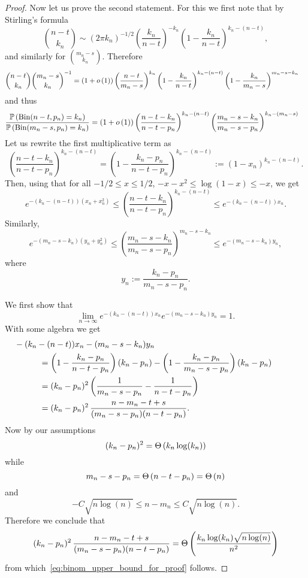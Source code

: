 \begin{appendices}
\begin{proof}
Now let us prove the second statement. For this we first note that by Stirling's formula
\[
	\binom{n-t}{k_n} \sim (2\pi k_n)^{-1/2} \left(\frac{k_n}{n-t}\right)^{-k_n}\left(1 - \frac{k_n}{n-t}\right)^{k_n - (n-t)},
\]
and similarly for $\binom{m_n-s}{k_n}$. Therefore
\begin{align*}
	\binom{n-t}{k_n} \binom{m_n - s}{k_n}^{-1}
	&= (1+o\left(1\right)) \left(\frac{n - t}{m_n-s}\right)^{k_n}\left(1 - \frac{k_n}{n-t}\right)^{k_n - (n-t)}
		\left(1 - \frac{k_n}{m_n-s}\right)^{m_n - s - k_n}
\end{align*}
and thus
\begin{align*}
	\frac{\mathbb{P}\left(\mathrm{Bin}(n-t,p_n) = k_n\right)}{\mathbb{P}\left(\mathrm{Bin}(m_n-s,p_n) = k_n\right)}
	&= (1+o\left(1\right)) \left(\frac{n - t - k_n}{n - t - p_n}\right)^{k_n - (n-t)} 
		\left(\frac{m_n - s - k_n}{m_n-s - p_n}\right)^{k_n - (m_n - s)}
\end{align*}
Let us rewrite the first multiplicative term as 
\[
	\left(\frac{n - t - k_n}{n - t - p_n}\right)^{k_n - (n-t)} 
	= \left(1 - \frac{k_n - p_n}{n - t -p_n}\right)^{k_n - (n-t)} := (1-x_n)^{k_n - (n-t)}.
\]
Then, using that for all $-1/2 \le x \le 1/2$, $-x - x^2 \le \log(1-x) \le -x$, we get
\[
	e^{-(k_n - (n-t))\left(x_n + x_n^2\right)}
	\le \left(\frac{n - t - k_n}{n - t - p_n}\right)^{k_n - (n-t)}
	\le e^{-(k_n - (n-t))x_n}.
\]
Similarly,
\[
	e^{-(m_n - s- k_n)\left(y_n + y_n^2\right)}
	\le \left(\frac{m_n - s - k_n}{m_n-s - p_n}\right)^{m_n - s - k_n}
	\le e^{-(m_n - s - k_n)y_n},
\]
where
\[
	y_n := \frac{k_n - p_n}{m_n - s -p_n}.
\]

We first show that 
\begin{equation}\label{eq:binom_upper_bound_for_proof}
	\lim_{n \to \infty} e^{-(k_n - (n-t))x_n}e^{-(m_n - s - k_n)y_n} = 1.
\end{equation}
With some algebra we get
\begin{align*}
	&\hspace{-30pt}-(k_n - (n-t))x_n - (m_n - s - k_n)y_n\\
	&= \left(1 - \frac{k_n -p_n}{n - t -p_n}\right)(k_n - p_n) 
		- \left(1 - \frac{k_n - p_n}{m_n - s - p_n}\right)(k_n - p_n)\\
	&= (k_n - p_n)^2 \left(\frac{1}{m_n - s - p_n} - \frac{1}{n - t - p_n}\right)\\
	&= (k_n - p_n)^2 \, \frac{n - m_n - t + s}{(m_n - s - p_n)(n - t - p_n)}.
\end{align*}
Now by our assumptions
\[
	(k_n - p_n)^2 = \Theta\left(k_n \log(k_n)\right)
\]
while
\[
	m_n - s - p_n = \Theta\left(n - t - p_n\right) = \Theta\left(n\right)
\]
and
\[
	-C \sqrt{n\log(n)} \le n - m_n \le C\sqrt{n \log(n)}.
\]
Therefore we conclude that
\[
	(k_n - p_n)^2 \, \frac{n - m_n - t + s}{(m_n - s - p_n)(n - t - p_n)} 
	= \Theta\left(\frac{k_n \log(k_n) \sqrt{n\log(n)}}{n^2}\right)
\]
from which~\eqref{eq:binom_upper_bound_for_proof} follows. 


\end{proof}
\end{appendices}
